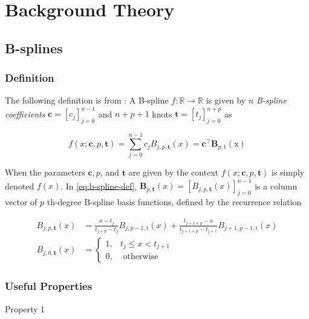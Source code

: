 
\chapter{Background Theory}
\label{chap:background-theory}

\section{B-splines}

\subsection{Definition}
The following definition is from \cite{Grimstad2016}:
A B-spline $f: \mathbb R \rightarrow \mathbb R$ is given by $n$ \emph{B-spline coefficients} $\mathbf c = [c_j]_{j=0}^{n-1}$ and $n+p+1$ knots $\mathbf t = [t_j]_{j=0}^{n+p}$ as

\begin{equation}\label{eq:b-spline-def}
    f(x ; \mathbf{c}, p, \mathbf{t})=\sum_{j=0}^{n-1} c_j B_{j, p, \mathbf{t}}(x)=\mathbf{c}^{\top} \mathbf{B}_{\mathrm{p}, \mathrm{t}}(\mathrm{x})
\end{equation}

When the parameters $\mathbf{c}, p$, and $\mathbf{t}$ are given by the context $f(x ; \mathbf{c}, p, \mathbf{t})$ is simply denoted $f(x)$. In \cref{eq:b-spline-def}, $\mathbf{B}_{p, \mathbf{t}}(x)=\left[B_{j, p, \mathbf{t}}(x)\right]_{j=0}^{n-1}$ is a column vector of $p$ th-degree B-spline basis functions, defined by the recurrence relation

\begin{equation}    
    \begin{aligned}
        B_{j, p, \mathbf{t}}(x) & =\frac{x-t_j}{t_{j+p}-t_j} B_{j, p-1, \mathrm{t}}(x)+\frac{t_{j+1+p}-x}{t_{j+1+p}-t_{j+1}} B_{j+1, p-1, \mathrm{t}}(x) \\
        B_{j, 0, \mathbf{t}}(x) & = 
        \begin{cases}
            1, & t_j \leq x<t_{j+1} \\
            0, & \text { otherwise }
        \end{cases}
    \end{aligned}
\end{equation}


\subsection{Useful Properties}
Property 1

